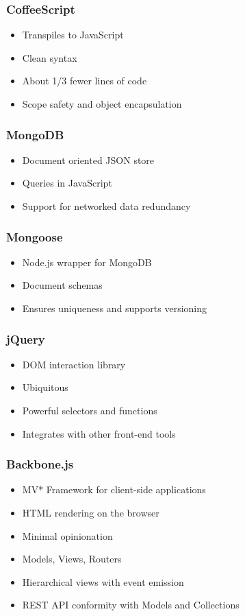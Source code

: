 \documentclass{beamer}
\begin{document}
\begin{frame}[fragile]
\frametitle{CoffeeScript}
	\begin{itemize}
  	 \item Transpiles to JavaScript
  	 \item Clean syntax
  	 \item About 1/3 fewer lines of code
	 \item Scope safety and object encapsulation
	\end{itemize}
\end{frame}

\begin{frame}[fragile]
\frametitle{MongoDB}
	\begin{itemize}
  	 \item Document oriented JSON store
  	 \item Queries in JavaScript
  	 \item Support for networked data redundancy
	\end{itemize}
\end{frame}

\begin{frame}[fragile]
\frametitle{Mongoose}
	\begin{itemize}
  	 \item Node.js wrapper for MongoDB
  	 \item Document schemas
  	 \item Ensures uniqueness and supports versioning
	\end{itemize}
\end{frame}

\begin{frame}[fragile]
\frametitle{jQuery}
	\begin{itemize}
  	 \item DOM interaction library
  	 \item Ubiquitous
  	 \item Powerful selectors and functions
	 \item Integrates with other front-end tools
	\end{itemize}
\end{frame}

\begin{frame}[fragile]
\frametitle{Backbone.js}
	\begin{itemize}
  	 \item MV* Framework for client-side applications
	 \item HTML rendering on the browser
  	 \item Minimal opinionation
	 \item Models, Views, Routers
  	 \item Hierarchical views with event emission
	 \item REST API conformity with Models and Collections
	\end{itemize}
\end{frame}
\end{document}

